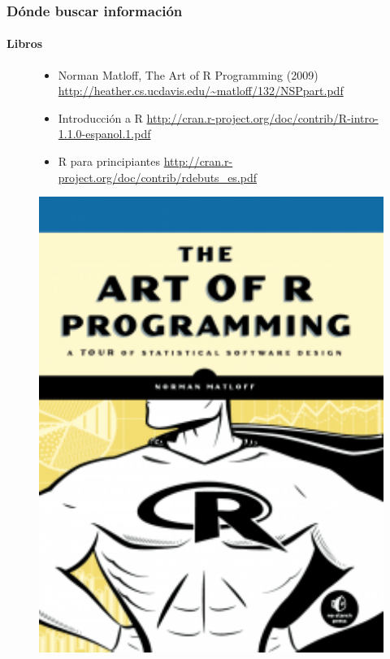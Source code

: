 \documentclass{beamer}\usepackage{graphicx, color}
\begin{document}
\begin{frame}[fragile]
\frametitle{D\'onde buscar informaci\'on}
\framesubtitle{Libros}

\begin{figure}
\begin{minipage}[b]{0.65\textwidth}
\begin{itemize}%
\item Norman Matloff, The Art of R Programming (2009) \url{http://heather.cs.ucdavis.edu/~matloff/132/NSPpart.pdf}
\item Introducci\'on a R \url{http://cran.r-project.org/doc/contrib/R-intro-1.1.0-espanol.1.pdf}
\item R para principiantes \url{http://cran.r-project.org/doc/contrib/rdebuts_es.pdf}
\end{itemize}
\end{minipage}
\begin{minipage}[b]{0.25\textwidth}
\centering
\includegraphics[width=1\textwidth]{theartofr}
\end{minipage}
\end{figure}
\end{frame}
\end{document}
